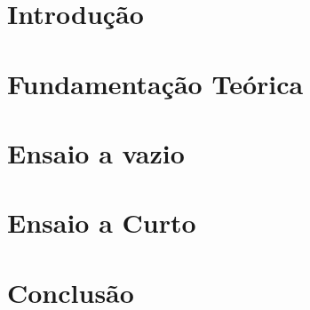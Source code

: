 \documentclass[capchap,sumarioincompleto,a4paper,12pt,ruledheader,normaltoc]{utfprtex}%
\begin{document}
\capa
\newpage
\sumario
\newpage
\newpage


\chapter{Introdução}



\chapter{Fundamentação Teórica}
	


\chapter{Ensaio a vazio}



\chapter{Ensaio a Curto}



\chapter{Conclusão}





\end{document}
